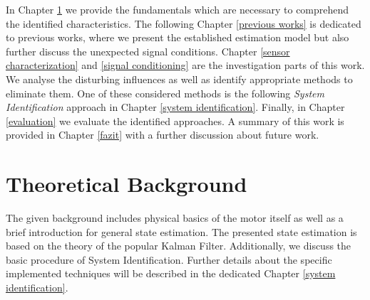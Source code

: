 \documentclass[english]{isasthesis}
\begin{document}
    In Chapter \ref{theoretical background} we provide the fundamentals which are necessary to comprehend the identified characteristics. The following Chapter \ref{previous works} is dedicated to previous works, where we  present the established estimation model but also further discuss the unexpected signal conditions. Chapter \ref{sensor characterization} and \ref{signal conditioning} are the investigation parts of this work. We analyse the disturbing influences as well as identify appropriate methods to eliminate them. One of these considered methods is the following \textit{System Identification} approach in Chapter \ref{system identification}. Finally, in Chapter \ref{evaluation} we evaluate the identified approaches. A summary of this work is provided in Chapter \ref{fazit} with a further discussion about future work. 
    \chapter{Theoretical Background} \label{theoretical background}
The given background includes physical basics of the motor itself as well as a brief introduction for general state estimation. The presented state estimation is based on the theory of the popular Kalman Filter. Additionally, we discuss the basic procedure of System Identification. Further details about the specific implemented techniques will be described in the dedicated Chapter \ref{system identification}. 
\end{document}
